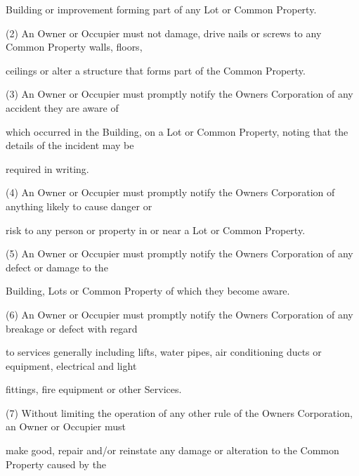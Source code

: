 \documentclass{article}
\begin{document}
{\fontsize{10.02}{1}Building or improvement forming part of any Lot or Common Property. }

{\fontsize{9.962}{1}(2) An Owner or Occupier must not damage, drive nails or screws to any Common Property walls, floors, }

{\fontsize{10.02}{1}ceilings or alter a structure that forms part of the Common Property. }


\newpage


















{\fontsize{9.962}{1}(3) An Owner or Occupier must promptly notify the Owners Corporation of any accident they are aware of }

{\fontsize{10.02}{1}which occurred in the Building, on a Lot or Common Property, noting that the details of the incident may be }

{\fontsize{10.02}{1}required in writing. }

{\fontsize{9.962}{1}(4) An Owner or Occupier must promptly notify the Owners Corporation of anything likely to cause danger or }

{\fontsize{10.02}{1}risk to any person or property in or near a Lot or Common Property. }

{\fontsize{9.962}{1}(5) An Owner or Occupier must promptly notify the Owners Corporation of any defect or damage to the }

{\fontsize{10.02}{1}Building, Lots or Common Property of which they become aware. }

{\fontsize{9.962}{1}(6) An Owner or Occupier must promptly notify the Owners Corporation of any breakage or defect with regard }

{\fontsize{10.02}{1}to services generally including lifts, water pipes, air conditioning ducts or equipment, electrical and light }

{\fontsize{10.02}{1}fittings, fire equipment or other Services. }

{\fontsize{9.962}{1}(7) Without limiting the operation of any other rule of the Owners Corporation, an Owner or Occupier must }

{\fontsize{10.02}{1}make good, repair and/or reinstate any damage or alteration to the Common Property caused by the }
\end{document}
